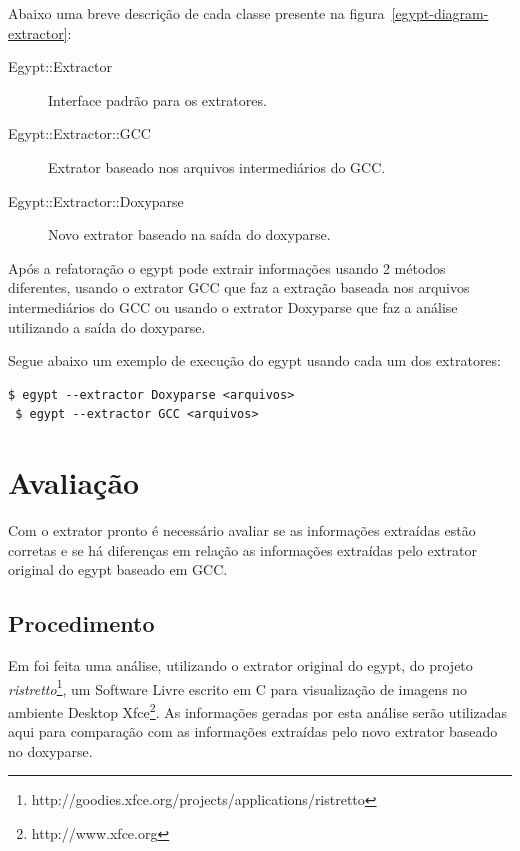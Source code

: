 Abaixo uma breve descrição de cada classe presente na
figura~\ref{egypt-diagram-extractor}:

\begin{description}
\item[Egypt::Extractor] Interface padrão para os extratores.
\item[Egypt::Extractor::GCC] Extrator baseado nos arquivos intermediários do GCC.
\item[Egypt::Extractor::Doxyparse] Novo extrator baseado na saída do doxyparse.
\end{description}

Após a refatoração o egypt pode extrair informações usando 2 métodos
diferentes, usando o extrator GCC que faz a extração baseada nos arquivos
intermediários do GCC ou usando o extrator Doxyparse que faz a análise
utilizando a saída do doxyparse.

Segue abaixo um exemplo de execução do egypt usando cada um dos extratores:

\begin{Verbatim}[frame=single,fontsize=\relsize{-2},fontfamily=courier]
 $ egypt --extractor Doxyparse <arquivos>
 $ egypt --extractor GCC <arquivos>
\end{Verbatim}


\chapter{Avaliação} \label{ch:avaliacao}

Com o extrator pronto é necessário avaliar se as informações extraídas estão
corretas e se há diferenças em relação as informações extraídas pelo extrator
original do egypt baseado em GCC.

\section{Procedimento}

Em \cite{structuralComplexityEvolution} foi feita uma análise, utilizando o
extrator original do egypt, do projeto {\it
ristretto}\footnote{http://goodies.xfce.org/projects/applications/ristretto},
um Software Livre escrito em C para visualização de imagens no ambiente Desktop
Xfce\footnote{http://www.xfce.org}. As informações geradas por esta análise
serão utilizadas aqui para comparação com as informações extraídas pelo novo
extrator baseado no doxyparse.

